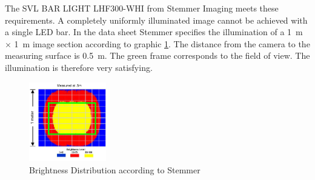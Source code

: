 The SVL BAR LIGHT LHF300-WHI from Stemmer Imaging meets these requirements.
A completely uniformly illuminated image cannot be achieved with a single LED bar.
In the data sheet Stemmer specifies the illumination of a \SI{1}{m} $\times$ \SI{1}{m} image section according to graphic \ref{fig:lighting_LEDBAR}.
The distance from the camera to the measuring surface is \SI{0.5}{m}.
The green frame corresponds to the field of view.
The illumination is therefore very satisfying.

\begin{figure}[h]
	\centering
	\includegraphics[width=0.3\textwidth]{graphics/brightness_level.pdf}
	\caption{Brightness Distribution according to Stemmer \cite{StemmerDatasheet}}
	\label{fig:lighting_LEDBAR}
\end{figure}